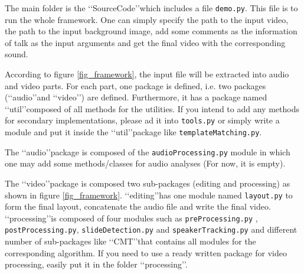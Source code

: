 \documentclass[[12pt,DIV14,BCOR12mm,a4paper,footexclude,headinclude,halfparskip-,twoside,openright,cleardoubleempty,idxtotoc,bibtotoc]{article}
\begin{document}
The main folder is the \lq\lq SourceCode\rq\rq which includes a file \texttt{demo.py}. This file is to run the whole framework. One can simply specify the path to the input video, the path to the input background image, add some comments as the information of talk as the input arguments and get the final video with the corresponding sound.

According to figure \ref{fig_framework}, the input file will be extracted into audio and video parts. For each part, one package is defined, i.e. two packages (\lq\lq audio\rq\rq and \lq\lq video\rq\rq) are defined. Furthermore, it has a package named \lq\lq util\rq\rq composed of all methods for the utilities. If you intend to add any methods for secondary implementations, please ad it into \texttt{tools.py} or simply write a module and put it inside the \lq\lq util\rq\rq package like \texttt{templateMatching.py}.

The \lq\lq audio\rq\rq package is composed of the \texttt{audioProcessing.py} module in which one may add some methods/classes for audio analyses (For now, it is empty).

The \lq\lq video\rq\rq package is composed two sub-packages (editing and processing) as shown in figure \ref{fig_framework}.  \lq\lq editing\rq\rq has one module named \texttt{layout.py} to form the final layout, concatenate the audio file and write the final video. \lq\lq processing\rq\rq is composed of four modules such as \texttt{preProcessing.py} , \texttt{postProcessing.py}, \texttt{slideDetection.py} and \texttt{speakerTracking.py} and different number of sub-packages like \lq\lq CMT\rq\rq that contains all modules for the corresponding algorithm. If you need to use a ready written package for video processing, easily put it in the folder \lq\lq processing\rq\rq.
\end{document}
